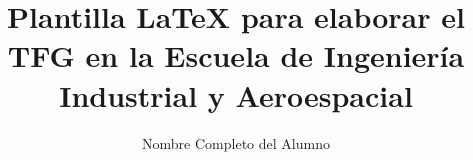 
\title{Plantilla \LaTeX{} para elaborar el TFG en la Escuela de Ingeniería Industrial y Aeroespacial}
\author{Nombre Completo del Alumno}










\address{UCLM --- Escuela de Ingeniería Industrial y Aeroespacial\\
    Campus Universitario de la Real Fábrica de Armas}
